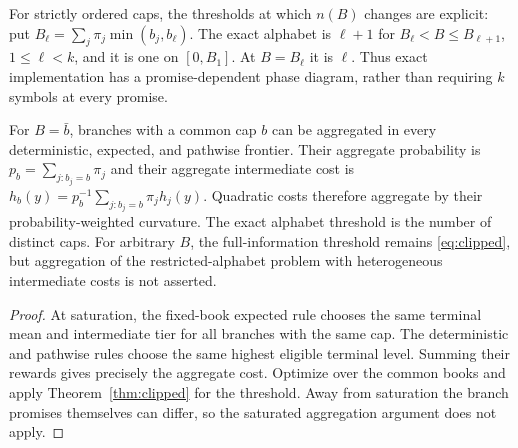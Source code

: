 For strictly ordered caps, the thresholds at which $n(B)$ changes are explicit: put $B_\ell=\sum_j\pi_j\min(b_j,b_\ell)$. The exact alphabet is $\ell+1$ for $B_\ell<B\leq B_{\ell+1}$, $1\leq\ell<k$, and it is one on $[0,B_1]$. At $B=B_\ell$ it is $\ell$. Thus exact implementation has a promise-dependent phase diagram, rather than requiring $k$ symbols at every promise.

\begin{proposition}\label{prop:repeated}
For $B=\bar b$, branches with a common cap $b$ can be aggregated in every deterministic, expected, and pathwise frontier. Their aggregate probability is $p_b=\sum_{j:b_j=b}\pi_j$ and their aggregate intermediate cost is $h_b(y)=p_b^{-1}\sum_{j:b_j=b}\pi_jh_j(y)$. Quadratic costs therefore aggregate by their probability-weighted curvature. The exact alphabet threshold is the number of distinct caps. For arbitrary $B$, the full-information threshold remains \eqref{eq:clipped}, but aggregation of the restricted-alphabet problem with heterogeneous intermediate costs is not asserted.
\end{proposition}
\begin{proof}
At saturation, the fixed-book expected rule chooses the same terminal mean and intermediate tier for all branches with the same cap. The deterministic and pathwise rules choose the same highest eligible terminal level. Summing their rewards gives precisely the aggregate cost. Optimize over the common books and apply Theorem~\ref{thm:clipped} for the threshold. Away from saturation the branch promises themselves can differ, so the saturated aggregation argument does not apply.
\end{proof}


